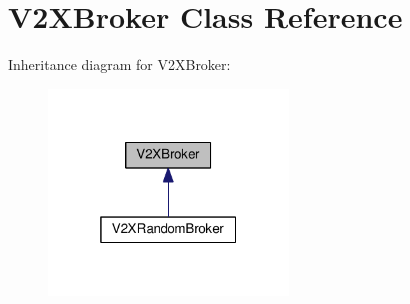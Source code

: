 \hypertarget{classV2XBroker}{}\section{V2\+X\+Broker Class Reference}
\label{classV2XBroker}


Inheritance diagram for V2\+X\+Broker\+:\nopagebreak
\begin{figure}[H]
\begin{center}
\leavevmode
\includegraphics[width=181pt]{classV2XBroker__inherit__graph}
\end{center}
\end{figure}
